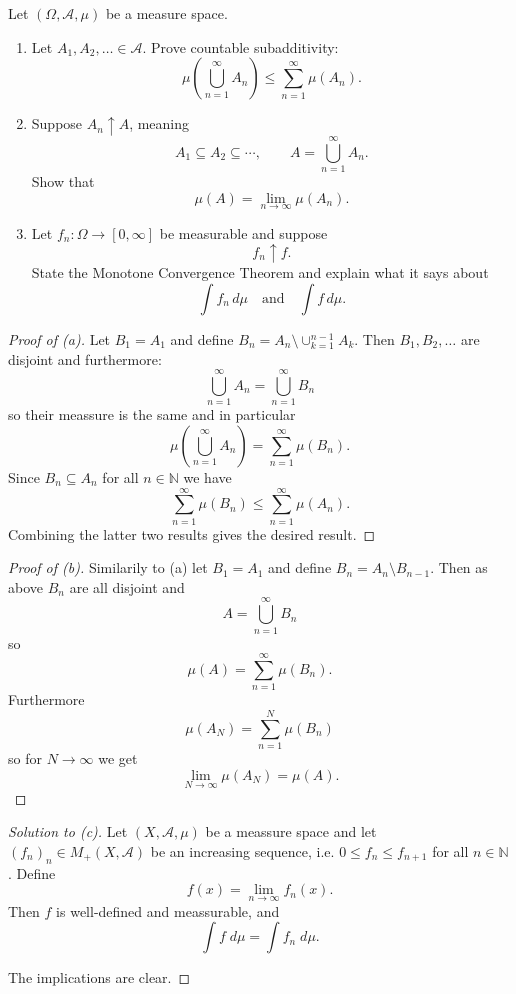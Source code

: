 \begin{prob}[Problem 4]
Let $(\Omega,\mathcal A,\mu)$ be a measure space.

\begin{enumerate}[label=\alph*)]
    \item Let $A_1,A_2,\ldots\in\mathcal A$. Prove countable subadditivity:
    \[
        \mu\left(\bigcup_{n=1}^{\infty}A_n\right)
        \leq
        \sum_{n=1}^{\infty}\mu(A_n).
    \]

    \item Suppose $A_n\uparrow A$, meaning
    \[
        A_1\subseteq A_2\subseteq\cdots,
        \qquad
        A=\bigcup_{n=1}^\infty A_n.
    \]
    Show that
    \[
        \mu(A)=\lim_{n\to\infty}\mu(A_n).
    \]

    \item Let $f_n:\Omega\to[0,\infty]$ be measurable and suppose
    \[
        f_n\uparrow f.
    \]
    State the Monotone Convergence Theorem and explain what it says about
    \[
        \int f_n\,d\mu
        \quad\text{and}\quad
        \int f\,d\mu.
    \]
\end{enumerate}
\end{prob}

\begin{proof}[Proof of (a)]
    Let $B_1 = A_1$ and define $B_n = A_n \setminus 
    \cup_{k=1}^{n-1}A_k$. Then $B_1,B_2,\ldots$ are disjoint and 
    furthermore: 
    \[
        \bigcup_{n=1}^\infty A_n = \bigcup_{n=1}^\infty B_n
    \]
    so their meassure is the same and in particular 
    \[
        \mu\left(\bigcup_{n=1}^\infty A_n\right) 
        = \sum_{n=1}^\infty \mu(B_n).
    \]
    Since $B_n \subseteq A_n$ for all $n \in \mathbb N$ we have 
    \[
        \sum_{n=1}^\infty \mu(B_n) \leq 
        \sum_{n=1}^\infty \mu(A_n).
    \]
    Combining the latter two results gives the desired result.
\end{proof}

\begin{proof}[Proof of (b)]
    Similarily to (a) let $B_1 = A_1$ and define 
    $B_n = A_n \setminus B_{n-1}$. Then as above $B_n$ are all 
    disjoint and 
    \[
        A = \bigcup_{n=1}^\infty B_n
    \]
    so 
    \[
        \mu(A) = \sum_{n=1}^\infty \mu(B_n).
    \]
    Furthermore 
    \[
        \mu(A_N) = \sum_{n=1}^N \mu(B_n) 
    \]
    so for $N \to \infty$ we get 
    \[
        \lim_{N\to\infty}\mu(A_N) = 
        \mu(A).
    \]
\end{proof}

\begin{proof}[Solution to (c)]
    Let $(X,\mathcal A, \mu)$ be a meassure space and let 
    $(f_n)_n \in M_+(X,\mathcal A)$ be an increasing sequence, i.e.
    $0 \leq f_n \leq f_{n+1}$ for all $n \in \mathbb N$.
    Define 
    \[
        f(x) = \lim_{n\to\infty} f_n(x).
    \]
    Then $f$ is well-defined and meassurable, and 
    \[
        \int f \; d\mu = \int f_n \; d\mu.
    \]

    The implications are clear. 
\end{proof}

